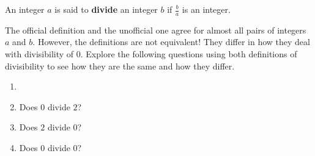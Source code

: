 \medskip

\begin{definition}
	An integer $a$ is said to \textbf{divide} an integer $b$ if $\frac{b}{a}$ is an integer.
\end{definition} 

The official definition and the unofficial one agree for almost all pairs of integers $a$ and $b$.  However, the definitions are not equivalent!  They differ in how they deal with divisibility of $0$.  Explore the following questions using both definitions of divisibility to see how they are the same and how they differ.

\begin{xca}
	\begin{enumerate}
				\item[]\mbox{}\\
		\item Does $0$ divide $2$?  
		\item Does $2$ divide $0$?  
		\item Does $0$ divide $0$?
	\end{enumerate}
\end{xca}

